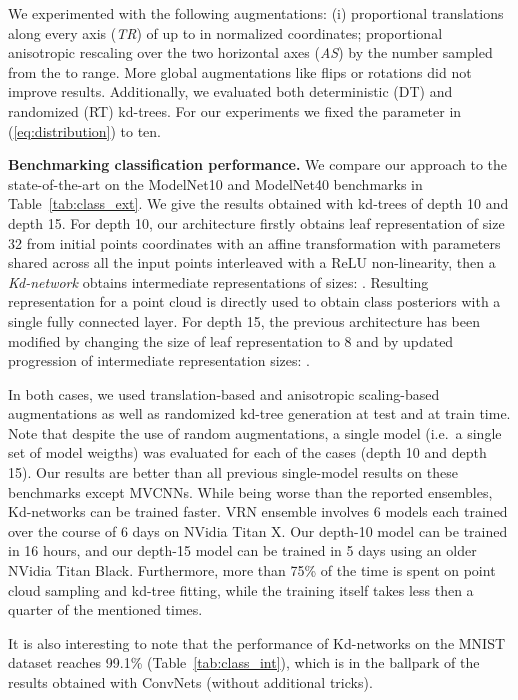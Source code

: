 \documentclass[10pt,twocolumn,letterpaper]{article}
\newcommand{\tab}[1]{Table~\ref{tab:#1}}
\newcommand{\eq}[1]{(\ref{eq:#1})}
\begin{document}
We experimented with the following augmentations: (i) proportional translations along every axis (\textit{TR}) of up to  in normalized coordinates; proportional anisotropic rescaling over the two horizontal axes (\textit{AS}) by the number sampled from the  to  range. More global augmentations like flips or rotations did not improve results. Additionally, we evaluated both deterministic (DT) and randomized (RT) kd-trees. For our experiments we fixed the parameter  in \eq{distribution} to ten.

\textbf{Benchmarking classification performance.} We compare our approach to the state-of-the-art on the ModelNet10 and ModelNet40 benchmarks in \tab{class_ext}. We give the results obtained with kd-trees of depth 10 and depth 15. For depth 10, our architecture firstly obtains leaf representation of size 32 from initial points coordinates with an affine transformation with parameters shared across all the input points interleaved with a ReLU non-linearity, then a \textit{Kd-network} obtains intermediate representations of sizes: . Resulting representation for a point cloud is directly used to obtain class posteriors with a single fully connected layer. For depth 15, the previous architecture has been modified by changing the size of leaf representation to 8 and by updated progression of intermediate representation sizes: . 

In both cases, we used translation-based and anisotropic scaling-based augmentations as well as randomized kd-tree generation at test and at train time. Note that despite the use of random augmentations, a single model (i.e.\ a single set of model weigths) was evaluated for each of the cases (depth 10 and depth 15). Our results are better than all previous single-model results on these benchmarks except MVCNNs. While being worse than the reported ensembles, Kd-networks can be trained faster. VRN ensemble involves 6 models each trained over the course of 6 days on NVidia Titan X. Our depth-10 model can be trained in 16 hours, and our depth-15 model can be trained in 5 days using an older NVidia Titan Black. Furthermore, more than 75\% of the time is spent on point cloud sampling and kd-tree fitting, while the training itself takes less then a quarter of the mentioned times.  

It is also interesting to note that the performance of Kd-networks on the MNIST dataset reaches 99.1\% (\tab{class_int}), which is in the ballpark of the results obtained with ConvNets (without additional tricks).
\end{document}
